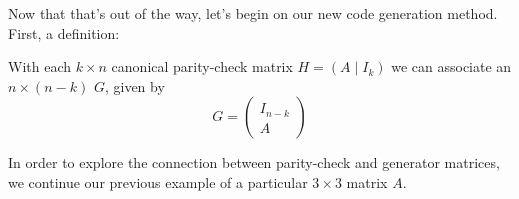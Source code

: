 Now that that's out of the way,  let's begin on our new code generation method.  First, a definition:

\begin{defn}\label{definition:algcodes:GeneratorMatrix}
With each $k \times n$ canonical parity-check matrix 
$H= (A \mid I_k)$
we can associate an $n \times
(n-k)$  $G$, given by 
\[
G =
\left(
 \begin{array}{c}
 I_{n-k} \\
A
 \end{array} \right)
\]
\end{defn}

In order to explore the connection between parity-check and generator matrices, we continue our previous example of a particular $3 \times 3$ matrix $A$.

